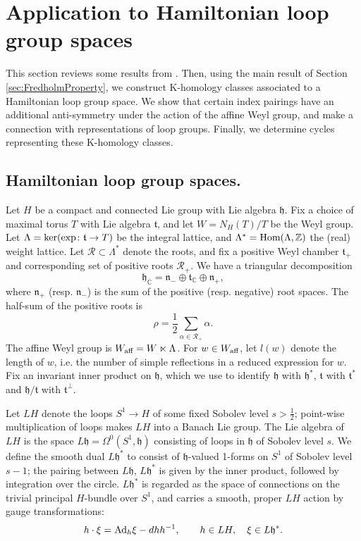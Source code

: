 \documentclass[11pt,reqno]{amsart}
\theoremstyle{definition}
\theoremstyle{remark}
\def\Ad{\ensuremath{\textnormal{Ad}}}
\def\t{\ensuremath{\mathfrak{t}}}
\def\h{\ensuremath{\mathfrak{h}}}
\def\n{\ensuremath{\mathfrak{n}}}
\def\R{\ensuremath{\mathcal{R}}}
\def\bC{\ensuremath{\mathbb{C}}}
\def\bZ{\ensuremath{\mathbb{Z}}}
\def\Hom{\ensuremath{\textnormal{Hom}}}
\def\ker{\ensuremath{\textnormal{ker}}}
\def\aff{\ensuremath{\textnormal{aff}}}
\begin{document}
\section{Application to Hamiltonian loop group spaces}\label{sec:GlobTrans}
This section reviews some results from \cite{LMSspinor}.  Then, using the main result of Section \ref{sec:FredholmProperty}, we construct K-homology classes associated to a Hamiltonian loop group space.  We show that certain index pairings have an additional anti-symmetry under the action of the affine Weyl group, and make a connection with representations of loop groups.  Finally, we determine cycles representing these K-homology classes.

\subsection{Hamiltonian loop group spaces.}\label{sec:LGSpace}
Let $H$ be a compact and connected Lie group with Lie algebra $\h$.  Fix a choice of maximal torus $T$ with Lie algebra $\t$, and let $W=N_H(T)/T$ be the Weyl group.  Let $\Lambda=\ker(\exp \colon \t \rightarrow T)$ be the integral lattice, and $\Lambda^\ast=\Hom(\Lambda,\bZ)$ the (real) weight lattice.  Let $\R \subset \Lambda^\ast$ denote the roots, and fix a positive Weyl chamber $\t_+$ and corresponding set of positive roots $\R_+$.  We have a triangular decomposition
\[ \h_{\bC}=\n_- \oplus \t_{\bC} \oplus \n_+,\]
where $\n_+$ (resp. $\n_-$) is the sum of the positive (resp. negative) root spaces.  The half-sum of the positive roots is
\[ \rho=\frac{1}{2}\sum_{\alpha \in \R_+} \alpha.\]
The affine Weyl group is $W_{\aff}=W\ltimes \Lambda$.  For $w \in W_{\aff}$, let $l(w)$ denote the length of $w$, i.e. the number of simple reflections in a reduced expression for $w$.  Fix an invariant inner product on $\h$, which we use to identify $\h$ with $\h^\ast$, $\t$ with $\t^\ast$ and $\h/\t$ with $\t^\perp$.

Let $LH$ denote the loops $S^1 \rightarrow H$ of some fixed Sobolev level $s > \tfrac{1}{2}$; point-wise multiplication of loops makes $LH$ into a Banach Lie group.  The Lie algebra of $LH$ is the space $L\h=\Omega^0(S^1,\h)$ consisting of loops in $\h$ of Sobolev level $s$.  We define the smooth dual $L\h^\ast$ to consist of $\h$-valued 1-forms on $S^1$ of Sobolev level $s-1$; the pairing between $L\h$, $L\h^\ast$ is given by the inner product, followed by integration over the circle.  $L\h^\ast$ is regarded as the space of connections on the trivial principal $H$-bundle over $S^1$, and carries a smooth, proper $LH$ action by gauge transformations:
\begin{equation}
\label{eqn:GaugeAction} 
h\cdot \xi=\Ad_h \xi - dh h^{-1}, \qquad h \in LH, \quad \xi \in L\h^\ast.
\end{equation}
\end{document}
